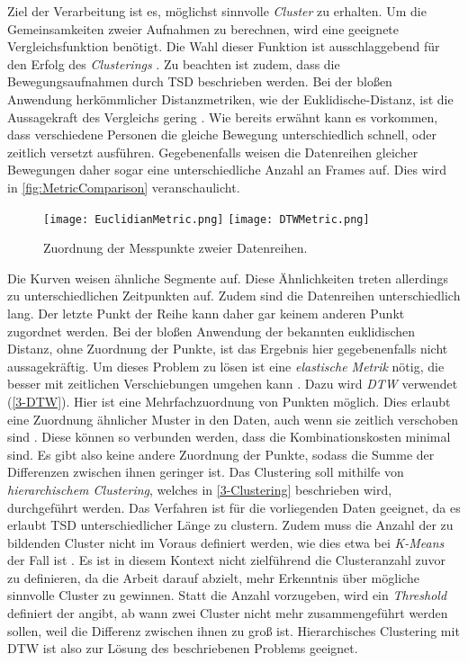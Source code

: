 Ziel der Verarbeitung ist es, möglichst sinnvolle \emph{Cluster} zu erhalten.
Um die Gemeinsamkeiten zweier Aufnahmen zu berechnen,
wird eine geeignete Vergleichsfunktion benötigt.
Die Wahl dieser Funktion ist ausschlaggebend für den Erfolg des \emph{Clusterings} \citep{warren_liao_clustering_2005}.
Zu beachten ist zudem, dass die Bewegungsaufnahmen durch \ac{TSD} beschrieben werden.
Bei der bloßen Anwendung herkömmlicher Distanzmetriken, wie der Euklidische-Distanz,
ist die Aussagekraft des Vergleichs gering \citep{warren_liao_clustering_2005}.
Wie bereits erwähnt kann es vorkommen, dass verschiedene Personen die gleiche Bewegung unterschiedlich schnell,
oder zeitlich versetzt ausführen.
Gegebenenfalls weisen die Datenreihen gleicher Bewegungen daher sogar eine unterschiedliche Anzahl an Frames auf.
Dies wird in \autoref{fig:MetricComparison} veranschaulicht.
\begin{figure}[ht]
    \begin{center}
    \texttt{[image: EuclidianMetric.png]}
    \texttt{[image: DTWMetric.png]}
    \end{center}
    \caption{Zuordnung der Messpunkte zweier Datenreihen.}
    \label{fig:MetricComparison}
\end{figure}
Die Kurven weisen ähnliche Segmente auf.
Diese Ähnlichkeiten treten allerdings zu unterschiedlichen Zeitpunkten auf.
Zudem sind die Datenreihen unterschiedlich lang.
Der letzte Punkt der Reihe kann daher gar keinem anderen Punkt zugordnet werden.
Bei der bloßen Anwendung der bekannten euklidischen Distanz,
ohne Zuordnung der Punkte, ist das Ergebnis hier gegebenenfalls nicht aussagekräftig.
Um dieses Problem zu lösen ist eine \emph{elastische Metrik} nötig,
die besser mit zeitlichen Verschiebungen umgehen kann \citep{aghabozorgi_time-series_2015}.
Dazu wird \emph{\ac{DTW}} verwendet (\autoref{3-DTW}).
Hier ist eine Mehrfachzuordnung von Punkten möglich.
Dies erlaubt eine Zuordnung ähnlicher Muster in den Daten, auch wenn sie zeitlich verschoben sind \citet{mohammadzade_dynamic_2021}.
Diese können so verbunden werden, dass die Kombinationskosten minimal sind.
Es gibt also keine andere Zuordnung der Punkte,
sodass die Summe der Differenzen zwischen ihnen geringer ist.
Das Clustering soll mithilfe von \emph{hierarchischem Clustering},
welches in \autoref{3-Clustering} beschrieben wird, durchgeführt werden.
Das Verfahren ist für die vorliegenden Daten geeignet,
da es erlaubt \ac{TSD} unterschiedlicher Länge zu clustern.
Zudem muss die Anzahl der zu bildenden Cluster nicht im Voraus definiert werden,
wie dies etwa bei \emph{K-Means} der Fall ist \citep{aghabozorgi_time-series_2015}.
Es ist in diesem Kontext nicht zielführend die Clusteranzahl zuvor zu definieren,
da die Arbeit darauf abzielt, mehr Erkenntnis über mögliche sinnvolle Cluster zu gewinnen.
Statt die Anzahl vorzugeben, wird ein \emph{Threshold} definiert der angibt,
ab wann zwei Cluster nicht mehr zusammengeführt werden sollen,
weil die Differenz zwischen ihnen zu groß ist.
Hierarchisches Clustering mit \ac{DTW} ist also zur Lösung des beschriebenen Problems geeignet.